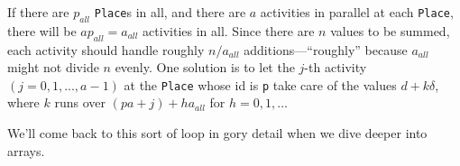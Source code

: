 If there are $p_{all}$ {\tt Place}s in all, and there are $a$ activities
in parallel at each {\tt Place}, there will be $ap_{all} = a_{all}$
activities in all. Since there are
$n$ values to be summed, each activity should handle roughly $n/a_{all}$
additions---``roughly'' because $a_{all}$ might not divide $n$ evenly.
One solution is to let the $j$-th
activity $( j=0,1,...,a-1)$ at the {\tt Place} whose id is {\tt p}  take care of the values 
$d+k\delta$, where $k$ runs over $(p a+j)+h a_{all}$ for $h = 0,1,\dots$

We'll come back to this sort of loop in gory detail when we dive deeper into \Xten{} arrays.
